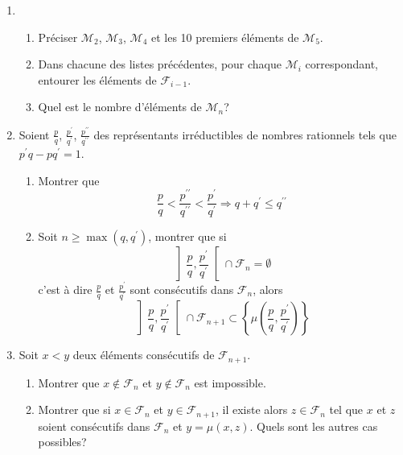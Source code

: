 \begin{enumerate}
\item  \begin{enumerate}
 \item Pr{\'e}ciser $\mathcal{M}_{2}$, $\mathcal{M}_{3}$, $\mathcal{M}_{4}$ et les 10 premiers éléments de $\mathcal{M}_{5}$.
 \item Dans chacune des listes précédentes, pour chaque $\mathcal{M}_{i}$ correspondant, entourer les éléments de $\mathcal{F}_{i-1}$.
 \item Quel est le nombre d'{\'e}l{\'e}ments de $\mathcal{M}_{n}$?
\end{enumerate}

\item  Soient $\frac{p}{q}$, $\frac{p^{\prime }}{q^{\prime }}$, $\frac{p^{\prime \prime }}{q^{\prime \prime }}$ des repr{\'e}sentants
irr{\'e}ductibles de nombres rationnels tels que $p^{\prime }q-pq^{\prime}=1$.

\begin{enumerate}
\item  Montrer que 
\begin{displaymath}
 \frac{p}{q}<\frac{p^{\prime \prime }}{q^{\prime \prime }}<\frac{p^{\prime }}{q^{\prime }} \Rightarrow q+q^{\prime }\leq q^{\prime
\prime }
\end{displaymath}

\item  Soit $n\geq \max (q,q^{\prime })$, montrer que si 
\begin{displaymath}
 \left] \frac{p}{q},\frac{p^{\prime }}{q^{\prime }}\right[ \cap \mathcal{F}_{n}=\emptyset
\end{displaymath}
c'est {\`a} dire $\frac{p}{q}$ et $\frac{p^{\prime }}{q^{\prime }}$ sont cons{\'e}cutifs dans $\mathcal{F}_{n}$, alors
\begin{displaymath}
 \left] \frac{p}{q},\frac{p^{\prime }}{q^{\prime }}\right[ \cap \mathcal{F}_{n+1}
\subset \left\{ \mu (\frac{p}{q},\frac{p^{\prime }}{q^{\prime }})\right\}
\end{displaymath}
\end{enumerate}
\item Soit $x<y$ deux éléments consécutifs de $\mathcal{F}_{n+1}$.
 \begin{enumerate}
   \item  Montrer que  $x\not\in \mathcal{F}_{n}$ et $y\not\in \mathcal{F}_{n}$ est impossible.
   \item Montrer que si $x\in \mathcal{F}_{n}$ et $y\in \mathcal{F}_{n+1}$, il existe alors $z \in \mathcal{F}_{n}$ tel que $x$ et $z$ soient consécutifs dans $\mathcal{F}_{n}$ et $y=\mu(x,z)$. Quels sont les autres cas possibles?
  \end{enumerate} 


\end{enumerate}
